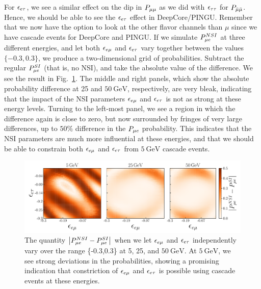 For $\epsilon_{e\tau}$, we see a similar effect on the dip in $P_{\mu\mu}$ as we did with $\epsilon_{\tau\tau}$ for $P_{\bar{\mu} \bar{\mu}}$. Hence, we should be able to 
see the $\epsilon_{e\tau}$ effect in DeepCore/PINGU. Remember that we now have the option to look at the other flavor channels than $\mu$ since we 
have cascade events for DeepCore and PINGU. If we simulate 
$P_{\mu e}^{NSI}$ at three different energies, and let both $\epsilon_{e\mu}$ and $\epsilon_{e\tau}$ vary together between the values $\{-0.3,0.3\}$, we produce a two-dimensional grid of probabilities.
Subtract the regular $P_{\mu e}^{SI}$ (that is, no NSI), and take the absolute value of the difference. We see the result in Fig.~\ref{fig:eem_eet_prob}. 
The middle and right panels, which show the absolute probability difference at \si{25} and $\SI{50}{\GeV}$, respectively, are very bleak,
indicating that the impact of the NSI parameters $\epsilon_{e\mu}$ and $\epsilon_{e\tau}$ is not as strong at these energy levels. Turning to the left-most panel,
we see a region in which the difference again is close to zero, but now surrounded by fringes of very large differences, up to $50\%$ difference 
in the $P_{\mu e}$ probability. This indicates that the NSI parameters are much more influential at these energies, and that we should be able to 
constrain both $\epsilon_{e\mu}$ and $\epsilon_{e\tau}$ from $\SI{5}{\GeV}$ cascade events.

\begin{figure}
    \centering
    \includegraphics[width=1\textwidth]{figures/eem_eet_prob.pdf}
    \caption{The quantity $\abs{P_{\mu e}^{NSI} - P_{\mu e}^{SI}}$ when we let $\epsilon_{e\mu}$ and $\epsilon_{e\tau}$ independently vary over
    the range \{-0.3,0.3\} at \si{5}, \si{25}, and $\SI{50}{\GeV}$. At $\SI{5}{\GeV}$, we see strong deviations in the probabilities, showing
    a promising indication that constriction of $\epsilon_{e\mu}$ and $\epsilon_{e\tau}$ is possible using cascade events at these energies.}\label{fig:eem_eet_prob}
\end{figure}


